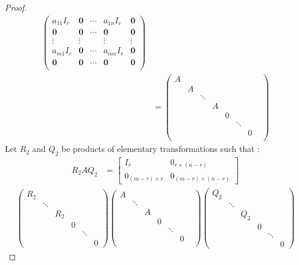 \documentclass[11pt]{article}
\begin{document}
\begin{proof}
\begin{align*}
\begin{pmatrix}
    a_{11}I_r & \bm{0} & \cdots & a_{1n}I_r & \bm{0}\\
    \bm{0} & \bm{0} & \cdots & \bm{0} & \bm{0}\\
    \vdots & \vdots & & \vdots & \vdots\\
    a_{m1}I_r & \bm{0} & \cdots & a_{mn}I_r & \bm{0}\\
    \bm{0} & \bm{0} & \cdots & \bm{0} & \bm{0}\\
    \end{pmatrix}\\
    &= \begin{pmatrix}
    A & & & & & &\\
    & A & & & & &\\
    & & \ddots & & & &\\
    & & & A & & & &\\
    & & & & 0 & & \\
    & & & & & \ddots &\\
    & & & & & & 0\\
    \end{pmatrix}
\end{align*}
Let $R_2$ and $Q_2$ be products of elementary transformations such that :
\begin{align*}
    R_2AQ_2 &=\begin{bmatrix}
    I_r & 0_{r\times(n-r)}\\
    0_{(m-r)\times r} & 0_{(m-r)\times (n-r)}
    \end{bmatrix}
\end{align*}
\begin{align*}
    \begin{pmatrix}
    R_2 & & & & & \\
    & \ddots & & & & \\
    & & R_2 & & &\\
    & & & 0 & &\\
    & & & & \ddots &\\
    & & & & & 0
    \end{pmatrix}
    \begin{pmatrix}
    A & & & & & &\\
    & \ddots & & & &\\
    & & A & & & &\\
    & & & 0 & & \\
    & & & & \ddots &\\
    & & & & & 0\\
    \end{pmatrix}
    \begin{pmatrix}
    Q_2 & & & & & \\
    & \ddots & & & & \\
    & & Q_2 & & &\\
    & & & 0 & &\\
    & & & & \ddots &\\
    & & & & & 0
    \end{pmatrix}
\end{align*}
\end{proof}

\end{document}
